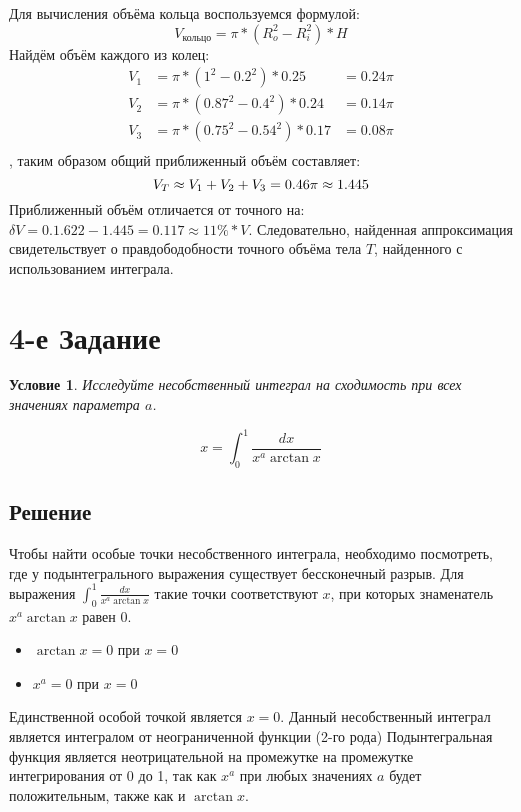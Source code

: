 \documentclass[12pt, a4paper]{article}
\newtheorem*{task}{Условие}
\begin{document}
Для вычисления объёма кольца воспользуемся формулой:
\begin{equation*}
V_{\text{кольцо}} = \pi * \left(R_{o}^2 - R_{i}^2\right) * H
\end{equation*}
Найдём объём каждого из колец:
\begin{equation*}
\begin{aligned}
V_1 &= \pi * \left(1^2 - 0.2^2\right) * 0.25&= 0.24\pi\\
V_2 &= \pi * \left(0.87^2 - 0.4^2\right) * 0.24&= 0.14\pi \\
V_3 &= \pi * \left(0.75^2 - 0.54^2\right) * 0.17&= 0.08\pi\\
\end{aligned}
\end{equation*}, таким образом общий приближенный объём составляет:
\begin{equation*}
V_T \approx V_1 + V_2 + V_3 = 0.46\pi \approx 1.445\\
\end{equation*}
Приближенный объём отличается от точного на: $\delta V = 0.1.622 - 1.445 = 0.117 \approx 11\% * V$. Следовательно, найденная аппроксимация свидетельствует о правдободобности точного объёма тела $T$, найденного с использованием интеграла.
\newpage
\section{4-е Задание}
\begin{task}
Исследуйте несобственный интеграл на сходимость при всех значениях параметра $a$.

\begin{equation*}
x = \int_0^1\frac{dx}{x^a\arctan x}
\end{equation*}
\end{task}

\subsection{Решение}

Чтобы найти особые точки несобственного интеграла, необходимо посмотреть, где у подынтегрального выражения существует бессконечный разрыв.
Для выражения $\int_0^1\frac{dx}{x^a\arctan x}$ такие точки соответствуют $x$, при которых знаменатель $x^a\arctan x$ равен $0$.


\begin{itemize}
		\item $\arctan x = 0$ при $x = 0$
		\item $x^a = 0$ при $x = 0$
\end{itemize}
Единственной особой точкой является $x = 0$. Данный несобственный интеграл является интегралом от неограниченной функции (2-го рода)
Подынтегральная функция является неотрицательной на промежутке на промежутке интегрирования от 0 до 1, так как $x^a$ при любых значениях $a$ будет положительным, также как и $\arctan x$.
\end{document}
